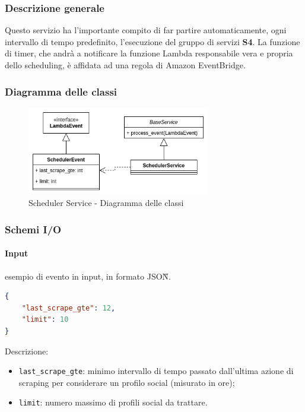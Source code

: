 \subsubsection{Descrizione generale}
Questo servizio ha l'importante compito di far partire automaticamente,
ogni intervallo di tempo predefinito, l'esecuzione del gruppo di servizi \textbf{S4}.
La funzione di timer, che andrà a notificare la funzione Lambda responsabile vera e propria dello
scheduling, è affidata ad una regola di Amazon EventBridge.

\subsubsection{Diagramma delle classi}
\begin{figure}[H]
    \includegraphics[width=8cm]{sezioni/images/cd_scheduler.png}
    \centering
    \caption{Scheduler Service - Diagramma delle classi}
\end{figure}

\subsubsection{Schemi I/O}
\paragraph*{Input} esempio di evento in input, in formato JSON\G{}.
\begin{lstlisting}[language=JSON]
{
    "last_scrape_gte": 12,
    "limit": 10
}
\end{lstlisting}
Descrizione:
\begin{itemize}
    \item \verb|last_scrape_gte|: minimo intervallo di tempo passato dall'ultima azione di scraping
    per considerare un profilo social (misurato in ore);
    \item \verb|limit|: numero massimo di profili social da trattare. 
\end{itemize}

